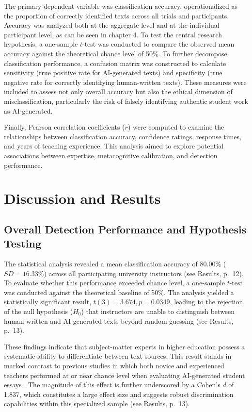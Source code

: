 \documentclass[12pt]{article}
\begin{document}
The primary dependent variable was classification accuracy, operationalized as the proportion of correctly identified texts across all trials and participants. Accuracy was analyzed both at the aggregate level and at the individual participant level, as can be seen in chapter 4. To test the central research hypothesis, a one-sample $t$-test was conducted to compare the observed mean accuracy against the theoretical chance level of 50\%. 
To further decompose classification performance, a confusion matrix was constructed to calculate sensitivity (true positive rate for AI-generated texts) and specificity (true negative rate for correctly identifying human-written texts). These measures were included to assess not only overall accuracy but also the ethical dimension of misclassification, particularly the risk of falsely identifying authentic student work as AI-generated.

Finally, Pearson correlation coefficients ($r$) were computed to examine the relationships between classification accuracy, confidence ratings, response times, and years of teaching experience. This analysis aimed to explore potential associations between expertise, metacognitive calibration, and detection performance.

\newpage
\section{Discussion and Results}

\subsection{Overall Detection Performance and Hypothesis Testing}

The statistical analysis revealed a mean classification accuracy of 80.00\% ($SD = 16.33\%$) across all participating university instructors (see Results, p.~12). To evaluate whether this performance exceeded chance level, a one-sample $t$-test was conducted against the theoretical baseline of 50\%. The analysis yielded a statistically significant result, $t(3) = 3.674, p = 0.0349$, leading to the rejection of the null hypothesis ($H_0$) that instructors are unable to distinguish between human-written and AI-generated texts beyond random guessing (see Results, p.~13).

These findings indicate that subject-matter experts in higher education possess a systematic ability to differentiate between text sources. This result stands in marked contrast to previous studies in which both novice and experienced teachers performed at or near chance level when evaluating AI-generated student essays \autocite[1]{fleckenstein_teachers_2024}. The magnitude of this effect is further underscored by a Cohen’s $d$ of 1.837, which constitutes a large effect size and suggests robust discrimination capabilities within this specialized sample (see Results, p.~13).
\end{document}
